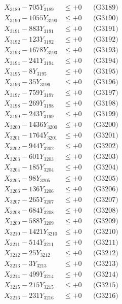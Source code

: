 \documentclass[a4paper,10pt]{article}
\begin{document}
{\begin{align}
X_{3189} - 705Y_{3189} &\leq +0 && \text{(G3189)} \\
X_{3190} - 1055Y_{3190} &\leq +0 && \text{(G3190)} \\
\allowbreak
X_{3191} - 883Y_{3191} &\leq +0 && \text{(G3191)} \\
X_{3192} - 123Y_{3192} &\leq +0 && \text{(G3192)} \\
X_{3193} - 1678Y_{3193} &\leq +0 && \text{(G3193)} \\
X_{3194} - 241Y_{3194} &\leq +0 && \text{(G3194)} \\
X_{3195} - 8Y_{3195} &\leq +0 && \text{(G3195)} \\
X_{3196} - 35Y_{3196} &\leq +0 && \text{(G3196)} \\
X_{3197} - 759Y_{3197} &\leq +0 && \text{(G3197)} \\
X_{3198} - 269Y_{3198} &\leq +0 && \text{(G3198)} \\
X_{3199} - 243Y_{3199} &\leq +0 && \text{(G3199)} \\
X_{3200} - 1436Y_{3200} &\leq +0 && \text{(G3200)} \\
\allowbreak
X_{3201} - 1764Y_{3201} &\leq +0 && \text{(G3201)} \\
X_{3202} - 944Y_{3202} &\leq +0 && \text{(G3202)} \\
X_{3203} - 601Y_{3203} &\leq +0 && \text{(G3203)} \\
X_{3204} - 185Y_{3204} &\leq +0 && \text{(G3204)} \\
X_{3205} - 98Y_{3205} &\leq +0 && \text{(G3205)} \\
X_{3206} - 136Y_{3206} &\leq +0 && \text{(G3206)} \\
X_{3207} - 265Y_{3207} &\leq +0 && \text{(G3207)} \\
X_{3208} - 684Y_{3208} &\leq +0 && \text{(G3208)} \\
X_{3209} - 588Y_{3209} &\leq +0 && \text{(G3209)} \\
X_{3210} - 1421Y_{3210} &\leq +0 && \text{(G3210)} \\
\allowbreak
X_{3211} - 514Y_{3211} &\leq +0 && \text{(G3211)} \\
X_{3212} - 25Y_{3212} &\leq +0 && \text{(G3212)} \\
X_{3213} - 3Y_{3213} &\leq +0 && \text{(G3213)} \\
X_{3214} - 499Y_{3214} &\leq +0 && \text{(G3214)} \\
X_{3215} - 215Y_{3215} &\leq +0 && \text{(G3215)} \\
X_{3216} - 231Y_{3216} &\leq +0 && \text{(G3216)} \\

\end{align}}
\end{document}
